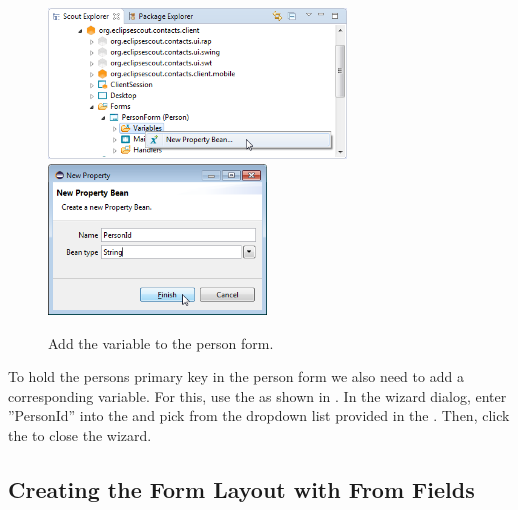 \documentclass[a4paper,10pt,twoside]{book}
\begin{document}
\begin{figure}
\includegraphics[height=4cm]{new_bean_personid_contextmenu.png} \hspace{5mm}
\includegraphics[height=4cm]{new_bean_personid.png}
\caption{Add the  variable to the person form.}
\end{figure}

To hold the persons primary key in the person form we also need to add a corresponding variable. 
For this, use the  as shown in . 
In the wizard dialog, enter ''PersonId'' into the  and pick  from the dropdown list provided in the . 
Then, click the  to close the wizard. 

\subsection{Creating the Form Layout with From Fields}
\end{document}
